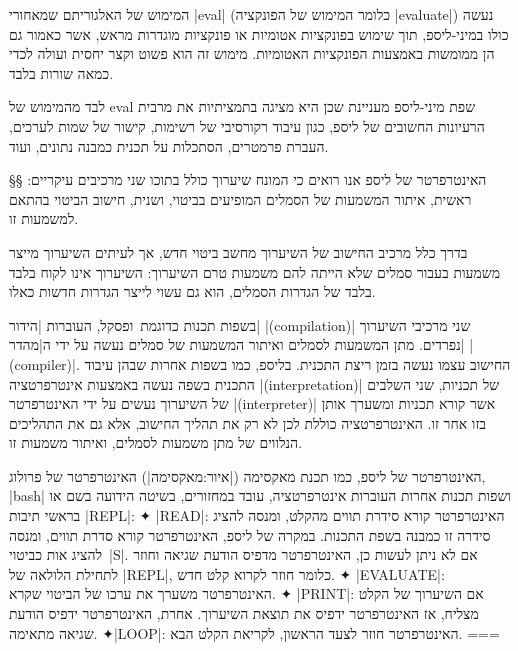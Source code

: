 המימוש של האלגוריתם שמאחורי \E|eval| (כלומר המימוש של הפונקציה \E|evaluate|)
נעשה כולו במיני-ליספ, תוך שימוש בפונקציות אטומיות או פונקציות מוגדרות מראש, אשר
כאמור גם הן ממומשות באמצעות הפונקציות האטומיות. מימוש זה הוא פשוט וקצר יחסית
ועולה לכדי כמאה שורות בלבד.

לבד מהמימוש של eval שפת מיני-ליספ מעניינת שכן היא מציגה בתמציתיות את מרבית
הרעיונות החשובים של ליספ, כגון עיבוד רקורסיבי של רשימות, קישור של שמות לערכים,
העברת פרמטרים, הסתכלות על תכנית כמבנה נתונים, ועוד.

§§ האינטרפרטר של ליספ
אנו רואים כי המונח שיערוך כולל בתוכו שני מרכיבים עיקריים: ראשית, איתור המשמעות
של הסמלים המופיעים בביטוי, ושנית, חישוב הביטוי בהתאם למשמעות זו.

בדרך כלל מרכיב החישוב של השיערוך מחשב ביטוי חדש, אך לעיתים השיערוך מייצר משמעות
בעבור סמלים שלא הייתה להם משמעות טרם השיערוך: השיערוך אינו לקוח בלבד
בלבד של הגדרות הסמלים, הוא גם עשוי לייצר הגדרות חדשות כאלו.

בשפות תכנות כדוגמת~\CPL ופסקל, העוברות \ע|הידור| \E|(compilation)| שני מרכיבי
השיערוך נפרדים. מתן המשמעות לסמלים ואיתור המשמעות של סמלים נעשה על ידי
ה\ע|מהדר| \E|(compiler)|. החישוב עצמו נעשה בזמן ריצת התכנית. בליספ, כמו בשפות
אחרות שבהן עיבוד התכנית בשפה נעשה באמצעות אינטרפרטציה \E|(interpretation)| של
תכניות, שני השלבים של השיערוך נעשים על ידי האינטרפרטר \E|(interpreter)| אשר
קורא תכניות ומשערך אותן בזו אחר זו. האינטרפרטציה כוללת לכן לא רק את תהליך
החישוב, אלא גם את התהליכים הנלווים של מתן משמעות לסמלים, ואיתור משמעות זו.

\begin{minipage}{0.8\linewidth}
  \footnotesize
\begin{mdframed}[backgroundcolor=Lavender!20]
    האינטרפרטר של ליספ, כמו תכנת מאקסימה (|איור:מאקסימה|) האינטרפרטר של
    פרולוג, \E|bash| ושפות תכנות אחרות העוברות אינטרפרטציה, עובד במחזורים,
    בשיטה הידועה בשם
    או בראשי תיבות \E|REPL|:
    ✦ \E|READ|: האינטרפרטר קורא סידרת תווים מהקלט, ומנסה להציג סידרה זו כמבנה
    בשפת התכנות. במקרה של ליספ, האינטרפרטר קורא סדרת תווים, ומנסה להציג
    אות כביטוי~\E|S|. אם לא ניתן לעשות כן, האינטרפרטר מדפיס הודעת שגיאה וחוזר
    לתחילת הלולאה של \E|REPL|, כלומר חוזר לקרוא קלט חדש.
    ✦ \E|EVALUATE|: האינטרפרטר משערך את ערכו של הביטוי שקרא.
    ✦ \E|PRINT|: אם השיערוך של הקלט מצליח, אז האינטרפרטר ידפיס את תוצאת
    השיערוך. אחרת, האינטרפרטר ידפיס הודעת שגיאה מתאימה.
    ✦\E|LOOP|: האינטרפרטר חוזר לצעד הראשון, לקריאת הקלט הבא.
===
  \end{mdframed}
\end{minipage}

